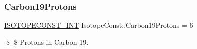 \subsubsection{\texorpdfstring{Carbon19\+Protons}{Carbon19Protons}}
{\footnotesize\ttfamily \mbox{\hyperlink{group___isotope_const-_macros_ga5f18360b3e99483a35c32d789e62621c}{I\+S\+O\+T\+O\+P\+E\+C\+O\+N\+S\+T\+\_\+\+I\+NT}} Isotope\+Const\+::\+Carbon19\+Protons = 6}

\$ \$ Protons in Carbon-\/19. 